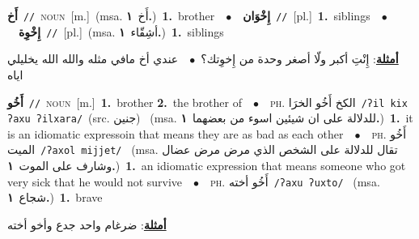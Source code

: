 \documentclass[10pt,a4paper,twoside]{article} %
\begin{document}
\begin{multicols}{2}
{{{{{{{{{{\setlength\topsep{0pt}\textbf{\foreignlanguage{arabic}{أَخ}}\ {\color{gray}\texttt{//}\color{black}}\ \textsc{noun}\ [m.]\ \color{gray}(msa. \foreignlanguage{arabic}{أَخ}~\foreignlanguage{arabic}{\textbf{١.}})\color{black}\ \textbf{1.}~brother\ \ $\bullet$\ \ \setlength\topsep{0pt}\textbf{\foreignlanguage{arabic}{إِخْوَان}}\ {\color{gray}\texttt{//}\color{black}}\ [pl.]\ \textbf{1.}~siblings\ \ $\bullet$\ \ \setlength\topsep{0pt}\textbf{\foreignlanguage{arabic}{إِخْوِة}}\ {\color{gray}\texttt{//}\color{black}}\ [pl.]\ \color{gray}(msa. \foreignlanguage{arabic}{أشِقّاء}~\foreignlanguage{arabic}{\textbf{١.}})\color{black}\ \textbf{1.}~siblings\  \begin{flushright}\color{gray}\foreignlanguage{arabic}{\textbf{\underline{\foreignlanguage{arabic}{أمثلة}}}: إِنْتِ أكبر ولّا أصغر وحدة من إِخوِتك؟\ $\bullet$\ \  عندي أخ مافي مثله والله الله يخليلي اياه}\end{flushright}\color{black}} \vspace{2mm}

{\setlength\topsep{0pt}\textbf{\foreignlanguage{arabic}{أَخُو}}\ {\color{gray}\texttt{//}\color{black}}\ \textsc{noun}\ [m.]\ \textbf{1.}~brother  \textbf{2.}~the brother of\ \ $\bullet$\ \ \textsc{ph.} \color{gray} \foreignlanguage{arabic}{الكخ أَخُو الخرَا}\color{black}\ {\color{gray}\texttt{/{\sffamily ʔil kix ʔaxu ʔilxara}/}\color{black}}\ \color{gray}(src. \foreignlanguage{arabic}{جنين})\color{black}\ \color{gray} (msa. \foreignlanguage{arabic}{للدلالة على ان شيئين اسوء من بعضهما}~\foreignlanguage{arabic}{\textbf{١.}})\color{black}\ \textbf{1.}~it is an idiomatic expressoin that means they are as bad as each other\ \ $\bullet$\ \ \textsc{ph.} \color{gray} \foreignlanguage{arabic}{أَخُو الميت}\color{black}\ {\color{gray}\texttt{/{\sffamily ʔaxol mijjet}/}\color{black}}\ \color{gray} (msa. \foreignlanguage{arabic}{تقال للدلالة على الشخص الذي مرض مرض عضال وشارف على الموت}~\foreignlanguage{arabic}{\textbf{١.}})\color{black}\ \textbf{1.}~an idiomatic expression that means someone who got very sick that he would not survive\ \ $\bullet$\ \ \textsc{ph.} \color{gray} \foreignlanguage{arabic}{أَخُو أخته}\color{black}\ {\color{gray}\texttt{/{\sffamily ʔaxu ʔuxto}/}\color{black}}\ \color{gray} (msa. \foreignlanguage{arabic}{شجاع}~\foreignlanguage{arabic}{\textbf{١.}})\color{black}\ \textbf{1.}~brave\  \begin{flushright}\color{gray}\foreignlanguage{arabic}{\textbf{\underline{\foreignlanguage{arabic}{أمثلة}}}: ضرغام واحد جدع وأخو أخته}\end{flushright}\color{black}} \vspace{2mm}

}}}}}}}}}
\end{multicols}
\end{document}
